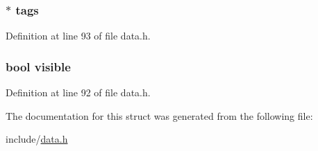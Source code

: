 \subsubsection[{\texorpdfstring{tags}{tags}}]{$\ast$ tags}\hypertarget{struct_relation_a5b3cb60eeefcbc271683754bf243aebb}{}\label{struct_relation_a5b3cb60eeefcbc271683754bf243aebb}


Definition at line 93 of file data.\+h.

\subsubsection[{\texorpdfstring{visible}{visible}}]{\setlength{\rightskip}{0pt plus 5cm}bool visible}\hypertarget{struct_relation_aa54a57ae048476d840caf6d4d2c47aa3}{}\label{struct_relation_aa54a57ae048476d840caf6d4d2c47aa3}


Definition at line 92 of file data.\+h.



The documentation for this struct was generated from the following file\+:\begin{DoxyCompactItemize}
\item 
include/\hyperlink{data_8h}{data.\+h}\end{DoxyCompactItemize}
